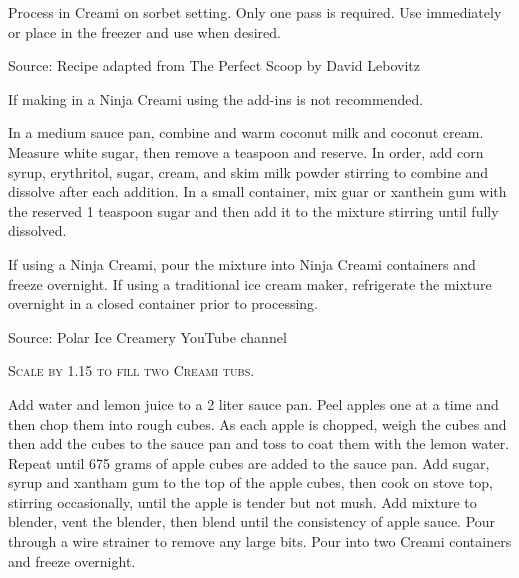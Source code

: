 \documentclass[letterpaper]{recipePMG}
\newcommand{\headnote}{\textsc}
\begin{document}
Process in Creami on sorbet setting.  Only one pass is required.  Use immediately or place in the freezer and use when desired.

Source: Recipe adapted from The Perfect Scoop by David Lebovitz



If making in a Ninja Creami using the add-ins is not recommended.

In a medium sauce pan, combine and warm coconut milk and coconut cream. Measure white sugar, then remove a teaspoon and reserve.  In order, add corn syrup, erythritol, sugar, cream, and skim milk powder stirring to combine and dissolve after each addition.  In a small container, mix guar or xanthein gum with the reserved 1 teaspoon sugar and then add it to the mixture stirring until fully dissolved. 

If using a Ninja Creami, pour the mixture into Ninja Creami containers and freeze overnight. If using a traditional ice cream maker, refrigerate the mixture overnight in a closed container prior to processing. 

Source: Polar Ice Creamery YouTube channel

\label{AppleSorbet}

\headnote{Scale by 1.15 to fill two Creami tubs.}



Add water and lemon juice to a 2 liter sauce pan. Peel apples one at a time and then chop them into rough cubes.  As each apple is chopped, weigh the cubes and then add the cubes to the sauce pan and toss to coat them with the lemon water. Repeat until 675 grams of apple cubes are added to the sauce pan. Add sugar, syrup and xantham gum to the top of the apple cubes, then cook on stove top, stirring occasionally, until the apple is tender but not mush.  Add mixture to blender, vent the blender, then blend until the consistency of apple sauce. Pour through a wire strainer to remove any large bits.  Pour into two Creami containers and freeze overnight.  
\end{document}
